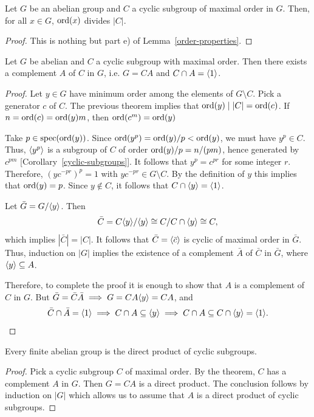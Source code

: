 \begin{thm}
    Let\/ $G$ be an abelian group and\/ $C$ a cyclic subgroup of maximal order in\/ $G$. Then, for all\/ $x \in G$,\/ ${\rm ord}(x)$ divides\/ $|C|$.
\end{thm}

\begin{proof} This is nothing but part e) of Lemma~\ref{order-properties}.  \end{proof}

\begin{thm}
    Let\/ $G$ be abelian and\/ $C$ a cyclic subgroup with maximal order. Then there exists a complement\/ $A$ of\/ $C$ in\/ $G$, i.e. $G = CA$ and\/ $C\cap A=\langle1\rangle$.
\end{thm}

\begin{proof} Let $y\in G$ have minimum order among the elements of $G\setminus C$. Pick a generator $c$ of $C$. The previous theorem implies that ${\rm ord}(y)\mid|C|={\rm ord}(c)$. If $n={\rm ord}(c)={\rm ord}(y)m$, then ${\rm ord}(c^m)={\rm ord}(y)$

Take $p\in\operatorname{spec}({\rm ord}(y))$. Since ${\rm ord}(y^p)={\rm ord}(y)/p<{\rm ord}(y)$, we must have $y^p\in C$. Thus, $\langle y^p\rangle$ is a subgroup of $C$ of order ${\rm ord}(y)/p=n/(pm)$, hence generated by $c^{pm}$ [Corollary~\ref{cyclic-subgroups}]. It follows that $y^p=c^{pr}$ for some integer $r$. Therefore, $(yc^{-pr})^p=1$ with $yc^{-pr}\in G\setminus C$. By the definition of $y$ this implies that ${\rm ord}(y)=p$. Since $y\notin C$, it follows that
$C\cap\langle y\rangle=\langle1\rangle$.

Let $\bar G=G/\langle y\rangle$. Then
$$
    \bar C= C\langle y\rangle / \langle y\rangle \cong C/C\cap\langle y\rangle\cong C,
$$
which implies $|\bar C|=|C|$. It follows that $\bar C=\langle\bar c\rangle$ is cyclic of maximal order in $\bar G$. Thus, induction on $|G|$ implies the existence of a complement $\bar A$ of $\bar C$ in $\bar G$, where $\langle y\rangle\subseteq A$.

Therefore, to complete the proof it is enough to show that $A$ is a complement of $C$ in $G$. But $\bar G=\bar C\bar A\implies G=CA\langle y\rangle=CA$, and
$$
    \bar C\cap\bar A=\langle1\rangle\implies C\cap A\subseteq\langle y\rangle
        \implies C\cap A\subseteq C\cap\langle y\rangle=\langle1\rangle.
$$
 \end{proof}

\begin{cor}\label{product-of-cyclic}
    Every finite abelian group is the direct product of cyclic subgroups.
\end{cor}

\begin{proof} Pick a cyclic subgroup $C$ of maximal order. By the theorem, $C$ has a complement $A$ in $G$. Then $G=CA$ is a direct product. The conclusion follows by induction on $|G|$ which allows us to assume that $A$ is a direct product of cyclic subgroups.  \end{proof}

